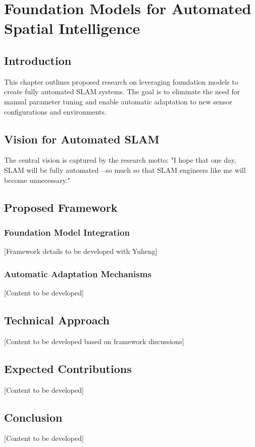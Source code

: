 \chapter{Foundation Models for Automated Spatial Intelligence} \label{chapter:foundation}

\section{Introduction}

This chapter outlines proposed research on leveraging foundation models to create fully automated SLAM systems. The goal is to eliminate the need for manual parameter tuning and enable automatic adaptation to new sensor configurations and environments.

\section{Vision for Automated SLAM}

The central vision is captured by the research motto: "I hope that one day, SLAM will be fully automated—so much so that SLAM engineers like me will become unnecessary."

\section{Proposed Framework}

\subsection{Foundation Model Integration}

[Framework details to be developed with Yuheng]

\subsection{Automatic Adaptation Mechanisms}

[Content to be developed]

\section{Technical Approach}

[Content to be developed based on framework discussions]

\section{Expected Contributions}

[Content to be developed]

\section{Conclusion}

[Content to be developed]